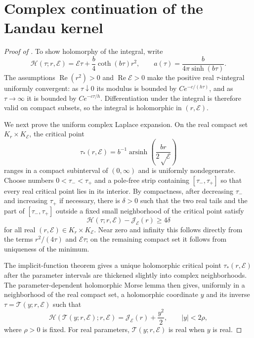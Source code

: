 \documentclass[11pt]{article}
\newcommand{\cE}{\mathcal E}
\newcommand{\cJ}{\mathcal J}
\newcommand{\Rea}{\operatorname{Re}}
\begin{document}
\section{Complex continuation of the Landau kernel}\label{app:complex-landau-kernel}
\begin{proof}[Proof of ]
To show holomorphy of the integral,
write
\[
 \mathcal H(\tau;r,\cE)
 =\cE\tau+\frac b4\coth(b\tau)r^2,
 \qquad
 a(\tau)=\frac{b}{4\pi\sinh(b\tau)}.
\]
The assumptions $\Rea(r^2)>0$ and $\Rea\cE>0$ make the positive real
$\tau$-integral uniformly convergent: as $\tau\downarrow0$ its modulus is
bounded by $Ce^{-c/(h\tau)}$, and as $\tau\to\infty$ it is bounded by
$Ce^{-c\tau/h}$.  Differentiation under the integral is therefore valid on
compact subsets, so the integral is holomorphic in $(r,\cE)$.

We next prove the uniform complex Laplace expansion.  On the real compact set
$K_r\times K_\cE$, the critical point
\[
 \tau_*(r,\cE)=b^{-1}\operatorname{arsinh}
 \left(\frac{br}{2\sqrt\cE}\right)
\]
ranges in a compact subinterval of $(0,\infty)$ and is uniformly
nondegenerate.  Choose numbers $0<\tau_-<\tau_+$ and a pole-free strip
containing $[\tau_-,\tau_+]$ so that every real critical point lies in its
interior.  By compactness, after decreasing $\tau_-$ and increasing
$\tau_+$ if necessary, there is $\delta>0$ such that the two real tails and
the part of $[\tau_-,\tau_+]$ outside a fixed small neighborhood of the
critical point satisfy
\begin{equation}\label{eq:complex-kernel-reserve}
 \mathcal H(\tau;r,\cE)-\cJ_\cE(r)\ge4\delta
\end{equation}
for all real $(r,\cE)\in K_r\times K_\cE$.  Near zero and infinity this
follows directly from the terms $r^2/(4\tau)$ and $\cE\tau$; on the remaining
compact set it follows from uniqueness of the minimum.

The implicit-function theorem gives a unique holomorphic critical point
$\tau_*(r,\cE)$ after the parameter intervals are thickened slightly into
complex neighborhoods.  The parameter-dependent holomorphic Morse lemma
then gives, uniformly in a neighborhood of the real compact set, a
holomorphic coordinate $y$ and its inverse $\tau=\mathcal T(y;r,\cE)$ such
that
\begin{equation}\label{eq:complex-kernel-morse}
 \mathcal H(\mathcal T(y;r,\cE);r,\cE)
 =\cJ_\cE(r)+\frac{y^2}{2},
 \qquad |y|<2\rho,
\end{equation}
where $\rho>0$ is fixed.  For real parameters, $\mathcal T(y;r,\cE)$ is real
when $y$ is real.


\end{proof}
\end{document}
